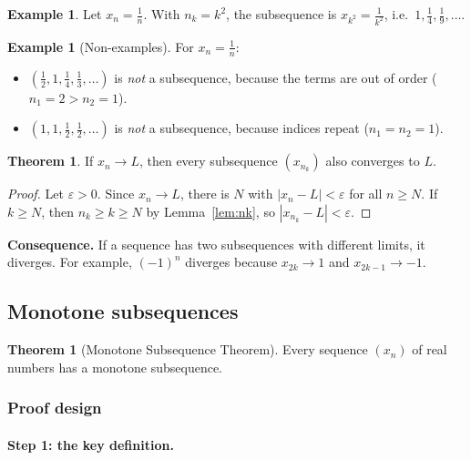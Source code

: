 \documentclass[11pt]{article}
\theoremstyle{definition}
\newtheorem{thm}[defn]{Theorem}
\newtheorem{ex}[defn]{Example}
\newcommand{\eps}{\varepsilon}
\newcommand{\key}[1]{\textcolor{red!70!black}{\textbf{#1}}}
\begin{document}
\begin{ex}
Let $x_n = \tfrac{1}{n}$. With $n_k = k^2$, the subsequence is
$x_{k^2} = \tfrac{1}{k^2}$, i.e.\ $1, \tfrac14, \tfrac19, \dots$.
\end{ex}

\begin{ex}[Non-examples]
For $x_n=\tfrac1n$:
\begin{itemize}[nosep]
  \item $(\tfrac12, 1, \tfrac14, \tfrac13, \dots)$ is \emph{not} a
        subsequence, because the terms are out of order ($n_1=2>n_2=1$).
  \item $(1, 1, \tfrac12, \tfrac12, \dots)$ is \emph{not} a subsequence,
        because indices repeat ($n_1=n_2=1$).
\end{itemize}
\end{ex}

\begin{thm}
If $x_n \to L$, then every subsequence $(x_{n_k})$ also converges to $L$.
\end{thm}

\begin{proof}
Let $\eps>0$. Since $x_n\to L$, there is $N$ with $|x_n-L|<\eps$ for all
$n\ge N$. If $k\ge N$, then $n_k\ge k\ge N$ by Lemma~\ref{lem:nk}, so
$|x_{n_k}-L|<\eps$.
\end{proof}

\noindent\key{Consequence.} If a sequence has two subsequences with
different limits, it diverges. For example, $(-1)^n$ diverges because
$x_{2k}\to 1$ and $x_{2k-1}\to -1$.

\subsection{Monotone subsequences}

\begin{thm}[Monotone Subsequence Theorem]\label{thm:monosub}
Every sequence $(x_n)$ of real numbers has a monotone subsequence.
\end{thm}

\subsubsection*{Proof design}

\paragraph{Step 1: the key definition.}
\end{document}
